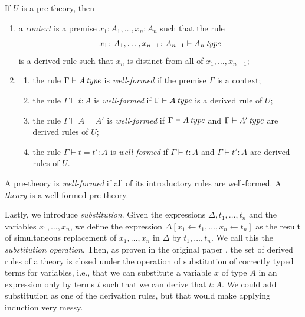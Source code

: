 \begin{definition}
    If $U$ is a pre-theory, then
    \begin{enumerate}
        \item a \textit{context} is a premise $x_1 \colon A_1, \dots, x_n \colon A_n$
            such that the rule
            \begin{equation*}
                x_1 \colon A_1, \dots, x_{n-1}\colon A_{n-1} \vdash A_n \operatorname{\mathit{\space type}}
            \end{equation*}
            is a derived rule such that $x_n$ is distinct from all of $x_1, \dots, x_{n-1}$;
        \item \begin{enumerate}
            \item the rule $\Gamma \vdash A \operatorname{\mathit{\space type}}$
                  is \textit{well-formed} if the premise $\Gamma$ is a context;
            \item the rule $\Gamma \vdash t \colon A$
                  is \textit{well-formed} if $\Gamma \vdash A \operatorname{\mathit{\space type}}$
                  is a derived rule of $U$;
            \item the rule $\Gamma \vdash A = A'$
                  is \textit{well-formed} if $\Gamma \vdash A \operatorname{\mathit{\space type}}$
                  and $\Gamma \vdash A' \operatorname{\mathit{\space type}}$
                  are derived rules of $U$;
            \item the rule $\Gamma \vdash t = t' \colon A$
                  is \textit{well-formed} if $\Gamma \vdash t \colon A$
                  and $\Gamma \vdash t' \colon A$
                  are derived rules of $U$.
        \end{enumerate}
    \end{enumerate}
\end{definition}

\begin{definition}
    A pre-theory is \textit{well-formed} if all of its introductory
    rules are well-formed.
    A \textit{theory} is a well-formed pre-theory.
\end{definition}

Lastly, we introduce \textit{substitution}.
Given the expressions $\Delta, t_1, \dots, t_n$ and the variables $x_1, \dots, x_n$,
we define the expression $\Delta[x_1 \leftarrow t_1, \dots, x_n \leftarrow t_n]$
as the result of simultaneous replacement of $x_1, \dots, x_n$ in $\Delta$
by $t_1, \dots, t_n$. We call this the \textit{substitution operation}.
Then, as proven in the original paper \cite{cartmell1986}, 
the set of derived rules of a theory is closed under the 
operation of substitution of correctly typed terms 
for variables, i.e., that we can substitute a variable $x$ of type $A$ in an expression
only by terms $t$ such that we can derive that $t \colon A$.
We could add substitution as one of the derivation rules,
but that would make applying induction very messy.

